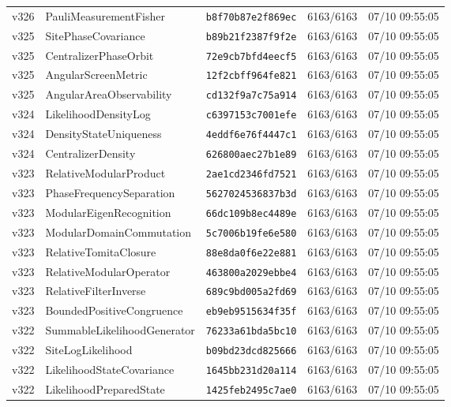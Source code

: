 \documentclass[11pt]{article}
\theoremstyle{definition}\newtheorem{deriv}{Derivação}
\begin{document}
{\begin{longtable}{@{}lllll@{}}
v326 & PauliMeasurementFisher & \texttt{b8f70b87e2f869ec} & 6163/6163 & 07/10 09:55:05 \\
v325 & SitePhaseCovariance & \texttt{b89b21f2387f9f2e} & 6163/6163 & 07/10 09:55:05 \\
v325 & CentralizerPhaseOrbit & \texttt{72e9cb7bfd4eecf5} & 6163/6163 & 07/10 09:55:05 \\
v325 & AngularScreenMetric & \texttt{12f2cbff964fe821} & 6163/6163 & 07/10 09:55:05 \\
v325 & AngularAreaObservability & \texttt{cd132f9a7c75a914} & 6163/6163 & 07/10 09:55:05 \\
v324 & LikelihoodDensityLog & \texttt{c6397153c7001efe} & 6163/6163 & 07/10 09:55:05 \\
v324 & DensityStateUniqueness & \texttt{4eddf6e76f4447c1} & 6163/6163 & 07/10 09:55:05 \\
v324 & CentralizerDensity & \texttt{626800aec27b1e89} & 6163/6163 & 07/10 09:55:05 \\
v323 & RelativeModularProduct & \texttt{2ae1cd2346fd7521} & 6163/6163 & 07/10 09:55:05 \\
v323 & PhaseFrequencySeparation & \texttt{5627024536837b3d} & 6163/6163 & 07/10 09:55:05 \\
v323 & ModularEigenRecognition & \texttt{66dc109b8ec4489e} & 6163/6163 & 07/10 09:55:05 \\
v323 & ModularDomainCommutation & \texttt{5c7006b19fe6e580} & 6163/6163 & 07/10 09:55:05 \\
v323 & RelativeTomitaClosure & \texttt{88e8da0f6e22e881} & 6163/6163 & 07/10 09:55:05 \\
v323 & RelativeModularOperator & \texttt{463800a2029ebbe4} & 6163/6163 & 07/10 09:55:05 \\
v323 & RelativeFilterInverse & \texttt{689c9bd005a2fd69} & 6163/6163 & 07/10 09:55:05 \\
v323 & BoundedPositiveCongruence & \texttt{eb9eb9515634f35f} & 6163/6163 & 07/10 09:55:05 \\
v322 & SummableLikelihoodGenerator & \texttt{76233a61bda5bc10} & 6163/6163 & 07/10 09:55:05 \\
v322 & SiteLogLikelihood & \texttt{b09bd23dcd825666} & 6163/6163 & 07/10 09:55:05 \\
v322 & LikelihoodStateCovariance & \texttt{1645bb231d20a114} & 6163/6163 & 07/10 09:55:05 \\
v322 & LikelihoodPreparedState & \texttt{1425feb2495c7ae0} & 6163/6163 & 07/10 09:55:05 \\

\end{longtable}}
\end{document}
